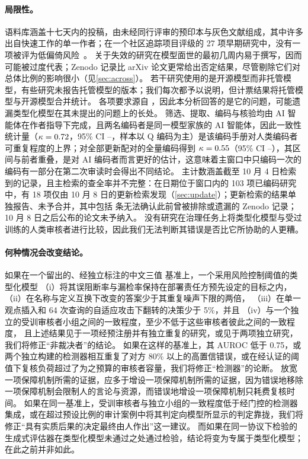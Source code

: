 \paragraph{局限性。}
语料库涵盖十七天内的投稿，由未经同行评审的预印本与灰色文献组成，其中许多出自快速工作的单一作者；在一个社区追踪项目评级的 27 项早期研究中，没有一项被评为低偏倚风险~\cite{rafe2026awesome}。
关于失效的研究在模型面世的最初几周内易于撰写，因而可能被过度代表；Zenodo 记录比 arXiv 论文更常给出否定结果，尽管剔除它们对总体比例的影响很小（见\cref{sec:across}）。
若干研究使用的是开源模型而非托管模型，有些研究未报告托管模型的版本；我们每次都予以说明，但计票结果将托管模型与开源模型合并统计。
各项要求源自 \pol{}，因此本分析回答的是它的问题，可能遗漏类型化模型在其未提出的问题上的长处。
筛选、提取、编码与核验均由 AI 智能体在作者指导下完成，且两名编码者是同一模型家族的 AI 智能体，因此一致性统计量（$\kappa = 0.72{}$，95\% CI \nKappaLo{}--\nKappaHi{}，样本以 Q 编码为主）是该编码手册对人类编码者可重复程度的上界；对全部更新配对的全量编码得到 $\kappa = 0.55{}$（95\% CI \nUKappaLo{}--\nUKappaHi{}），其区间与前者重叠，是对 AI 编码者而言更好的估计，这意味着主窗口中只编码一次的编码有一部分在第二次审读时会得出不同结论。
主计数涵盖截至 10 月 4 日检索到的记录，且主检索的查全率并不完整：在日期位于窗口内的 103 项已编码研究中，有 18 项仅由 10 月 8 日的更新检索发现（\cref{sec:update}）；更新检索的结果单独报告、未予合并，其中包括 \nUSetReScreened{} 条无法确认此前曾被排除或遗漏的 Zenodo 记录；10 月 8 日之后公布的论文未予纳入。
没有研究在治理任务上将类型化模型与受过训练的人类审核者进行比较，因此我们无法判断其错误是否比它所协助的人更糟。

\paragraph{何种情况会改变结论。}
如果在一个留出的、经独立标注的中文三值 \pol{} 基准上，一个采用风险控制阈值的类型化模型
（i）将其误阻断率与漏检率保持在部署责任方预先设定的目标之内，
（ii）在名称与定义互换下改变的答案少于其重复噪声下限的两倍，
（iii）在单一观点插入和 64 次查询的自适应攻击下翻转的决策少于 5\%，并且
（iv）与一个独立的受训审核者小组之间的一致程度，至少不低于这些审核者彼此之间的一致程度，
且上述结果见于一项经预注册并有独立重复的研究，或见于两项独立研究，我们将修正“非裁决者”的结论。
如果在这样的基准上，其 AUROC 低于 0.75，或两个独立构建的检测器相互重复了对方 80\% 以上的高置信错误，或在经认证的阈值下复核负荷超过了为之预算的审核者容量，我们将修正“检测器”的论断。
放宽一项保障机制所需的证据，应多于增设一项保障机制所需的证据，因为错误地移除一项保障机制会限制人的言论与资源，而错误地增设一项保障机制只耗费复核时间。
如果在同一基准上，受训审核者与独立小组的一致程度低于经门控的检测器集成，或在超过预设比例的审计案例中将其判定向模型所显示的判定靠拢，我们将修正“具有实质后果的决定最终由人作出”这一建议。
而如果在同一协议下检验的生成式评估器在类型化模型未通过之处通过检验，结论将变为专属于类型化模型；在此之前并非如此。

